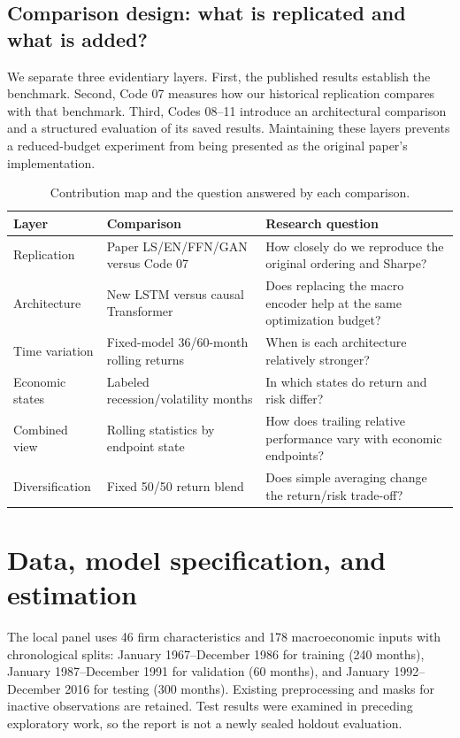 \documentclass[11pt]{article}
\begin{document}
\subsection{Comparison design: what is replicated and what is added?}
We separate three evidentiary layers. First, the published results establish the benchmark. Second, Code 07 measures how our historical replication compares with that benchmark. Third, Codes 08--11 introduce an architectural comparison and a structured evaluation of its saved results. Maintaining these layers prevents a reduced-budget experiment from being presented as the original paper's implementation.
\begin{table}[htbp]\centering\small
\caption{Contribution map and the question answered by each comparison.}\label{tab:contributions}
\begin{tabular}{p{.18\linewidth}p{.36\linewidth}p{.36\linewidth}}\toprule
Layer & Comparison & Research question \\\midrule
Replication & Paper LS/EN/FFN/GAN versus Code 07 & How closely do we reproduce the original ordering and Sharpe? \\
Architecture & New LSTM versus causal Transformer & Does replacing the macro encoder help at the same optimization budget? \\
Time variation & Fixed-model 36/60-month rolling returns & When is each architecture relatively stronger? \\
Economic states & Labeled recession/volatility months & In which states do return and risk differ? \\
Combined view & Rolling statistics by endpoint state & How does trailing relative performance vary with economic endpoints? \\
Diversification & Fixed 50/50 return blend & Does simple averaging change the return/risk trade-off? \\\bottomrule
\end{tabular}\end{table}

\section{Data, model specification, and estimation}
The local panel uses 46 firm characteristics and 178 macroeconomic inputs with chronological splits: January 1967--December 1986 for training (240 months), January 1987--December 1991 for validation (60 months), and January 1992--December 2016 for testing (300 months). Existing preprocessing and masks for inactive observations are retained. Test results were examined in preceding exploratory work, so the report is not a newly sealed holdout evaluation.
\end{document}
